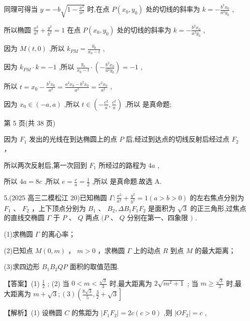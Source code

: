 \documentclass[10pt]{article}
\newcommand*\circled[1]{\tikz[baseline=(char.base)]{\node[shape=circle,draw,inner sep=1.5pt] (char) {\small #1};}}
\begin{document}
同理可得当 \(y =  - b\sqrt{1 - \frac{{x}^{2}}{{a}^{2}}}\) 时,在点 \(P\left( {{x}_{0},{y}_{0}}\right)\) 处的切线的斜率为 \(k =  - \frac{{b}^{2}{x}_{0}}{{a}^{2}{y}_{0}}\) ,

所以椭圆 \(\frac{{x}^{2}}{{a}^{2}} + \frac{{y}^{2}}{{b}^{2}} = 1\) 在点 \(P\left( {{x}_{0},{y}_{0}}\right)\) 处的切线的斜率为 \(k =  - \frac{{b}^{2}{x}_{0}}{{a}^{2}{y}_{0}}\) ,

因为 \(M\left( {t,0}\right)\) ,所以 \({k}_{PM} = \frac{{y}_{0}}{{x}_{0} - t}\) ,

因为 \({k}_{PM} \cdot  k =  - 1\) ,所以 \(\frac{{y}_{0}}{{x}_{0} - t} \cdot  \left( {-\frac{{b}^{2}{x}_{0}}{{a}^{2}{y}_{0}}}\right)  =  - 1\) ,

所以 \(t = {x}_{0} - \frac{{b}^{2}{x}_{0}}{{a}^{2}} = \frac{{a}^{2}{x}_{0} - {b}^{2}{x}_{0}}{{a}^{2}} = \frac{{c}^{2}{x}_{0}}{{a}^{2}}\) ,

因为 \({x}_{0} \in  \left( {-a,a}\right)\) ,所以 \(t \in  \left( {-\frac{{c}^{2}}{a},\frac{{c}^{2}}{a}}\right)\) ,所以 \circled{1} 是真命题;

第 5 页(共 38 页)

 \circled{2} 因为 \({F}_{1}\) 发出的光线在到达椭圆上的点 \(P\) 后,经过到达点的切线反射后经过点 \({F}_{2}\) ，

所以两次反射后,第一次回到 \({F}_{1}\) 所经过的路程为 \({4a}\) ,

所以 \({4a} = {8c}\) ,所以 \(e = \frac{c}{a} = \frac{1}{2}\) ,所以 \circled{2} 是真命题.故选 A.

5.(2025 高三二模松江 20)已知椭圆 \(\Gamma  : \frac{{x}^{2}}{{a}^{2}} + \frac{{y}^{2}}{{b}^{2}} = 1\left( {a > b > 0}\right)\) 的左右焦点分别为 \({F}_{1}\text{ 、 }{F}_{2}\) ，上下顶点分别为 \({B}_{1}\text{ 、 }{B}_{2},\Delta {B}_{1}{F}_{1}{F}_{2}\) 是面积为 \(\sqrt{3}\) 的正三角形,过焦点的直线交椭圆 \(\Gamma\) 于 \(P\text{ 、 }Q\) 两点 \((P\text{ 、 }Q\) 分别在第一、四象限 \()\) .

(1)求椭圆 \(\Gamma\) 的离心率；

(2)已知点 \(M\left( {0,m}\right)\) ， \(m > 0\) ，求椭圆 \(\Gamma\) 上的动点 \(R\) 到点 \(M\) 的最大距离；

(3)求四边形 \({B}_{1}{B}_{2}{QP}\) 面积的取值范围.

【答案】(1) \(\frac{1}{2}\) ; (2) 当 \(0 < m < \frac{\sqrt{3}}{3}\) 时,最大距离为 \(2\sqrt{{m}^{2} + 1}\) ; 当 \(m \geq  \frac{\sqrt{3}}{3}\) 时,最大距离为 \(m + \sqrt{3};\left( 3\right) \left( {\frac{8\sqrt{3}}{5},\frac{3}{2} + \sqrt{3}}\right\rbrack\)

【解析】(1) 设椭圆 \(C\) 的焦距为 \(\left| {{F}_{1}{F}_{2}}\right|  = {2c}\left( {c > 0}\right)\) ,则 \(\left| {O{F}_{2}}\right|  = c\) ,
\end{document}
